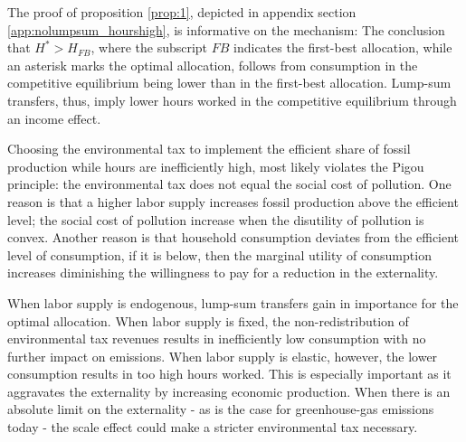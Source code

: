 
 
The proof of proposition \ref{prop:1}, depicted in appendix section \ref{app:nolumpsum_hourshigh}, is informative on the mechanism: The conclusion that $H^*>H_{FB}$, where the subscript $FB$ indicates the first-best allocation, while an asterisk marks the optimal allocation,  follows from consumption in the competitive equilibrium being lower than in the first-best allocation. Lump-sum transfers, thus, imply lower hours worked in the competitive equilibrium through an income effect.


Choosing the environmental tax to implement the efficient share of fossil production while hours are inefficiently high, most likely  violates the Pigou principle: the environmental tax does not equal the social cost of pollution. One reason is that a higher labor supply increases fossil production above the efficient level; the social cost of pollution increase when the disutility of pollution is convex. Another reason is that household consumption deviates from the efficient level of consumption, if it is below, then the marginal utility of consumption increases diminishing the willingness to pay for a reduction in the externality. 

When labor supply is endogenous, lump-sum transfers gain in importance for the optimal allocation. When labor supply is fixed, the non-redistribution of environmental tax revenues results in inefficiently low consumption with no further impact on emissions. When labor supply is elastic, however, the lower consumption results in too high hours worked. This is especially important as it aggravates the externality by increasing economic production. When there is an absolute limit on the externality - as is the case for greenhouse-gas emissions today - the scale effect could make a stricter environmental tax necessary. 

